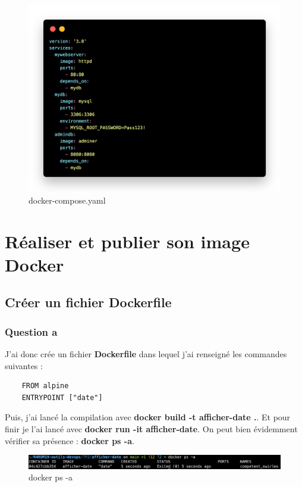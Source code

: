 \documentclass[12pt, a4paper]{article}
\begin{document}
\begin{figure}[h]
    \centering
    \includegraphics[width=1\textwidth]{img/code.png}
    \caption{docker-compose.yaml}
    \label{fig:code}
\end{figure}

\newpage
\section{Réaliser et publier son image Docker}
\subsection{Créer un fichier Dockerfile}
\subsubsection{Question a}
J'ai donc crée un fichier \textbf{Dockerfile} dans lequel j'ai renseigné les commandes suivantes :
\begin{lstlisting}
    FROM alpine
    ENTRYPOINT ["date"]
\end{lstlisting}

Puis, j'ai lancé la compilation avec \textbf{docker build -t afficher-date .}. Et 
pour finir je l'ai lancé avec \textbf{docker run -it afficher-date}. On peut bien évidemment
vérifier sa présence : \textbf{docker ps -a}.
\begin{figure}[h]
    \centering
    \includegraphics[width=1\textwidth]{img/psa.png}
    \caption{docker ps -a}
    \label{fig:date}
\end{figure}
\end{document}
